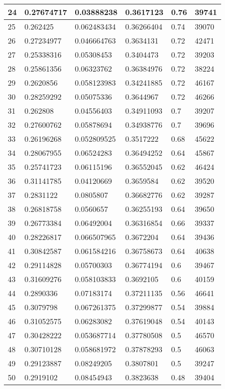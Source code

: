 \begin{longtable}{|l|l|l|l|l|l|}
24 & 0.27674717 & 0.03888238 & 0.3617123 & 0.76 & 39741 \\ \hline 
25 & 0.262425 & 0.062483434 & 0.36266404 & 0.74 & 39070 \\ \hline 
26 & 0.27234977 & 0.046664763 & 0.3634131 & 0.72 & 42471 \\ \hline 
27 & 0.25338316 & 0.05308453 & 0.3404473 & 0.72 & 39203 \\ \hline 
28 & 0.25861356 & 0.06323762 & 0.36384976 & 0.72 & 38224 \\ \hline 
29 & 0.2620856 & 0.058123983 & 0.34241885 & 0.72 & 46167 \\ \hline 
30 & 0.28259292 & 0.05075336 & 0.3644967 & 0.72 & 46266 \\ \hline 
31 & 0.262808 & 0.04556403 & 0.34911093 & 0.7 & 39207 \\ \hline 
32 & 0.27600762 & 0.05878694 & 0.34938776 & 0.7 & 39696 \\ \hline 
33 & 0.26196268 & 0.052809525 & 0.3517222 & 0.68 & 45622 \\ \hline 
34 & 0.28067955 & 0.06524283 & 0.36494252 & 0.64 & 45867 \\ \hline 
35 & 0.25741723 & 0.06115196 & 0.36552045 & 0.62 & 46424 \\ \hline 
36 & 0.31141785 & 0.04120669 & 0.3659584 & 0.62 & 39520 \\ \hline 
37 & 0.2831122 & 0.0805807 & 0.36682776 & 0.62 & 39287 \\ \hline 
38 & 0.26818758 & 0.0560657 & 0.36255193 & 0.64 & 39650 \\ \hline 
39 & 0.26773384 & 0.06492004 & 0.36316854 & 0.66 & 39337 \\ \hline 
40 & 0.28226817 & 0.066507965 & 0.3672204 & 0.64 & 39436 \\ \hline 
41 & 0.30842587 & 0.061584216 & 0.36758673 & 0.64 & 40638 \\ \hline 
42 & 0.29114828 & 0.05700303 & 0.36774194 & 0.6 & 39467 \\ \hline 
43 & 0.31609276 & 0.058103833 & 0.3692105 & 0.6 & 40159 \\ \hline 
44 & 0.2890336 & 0.07183174 & 0.37211135 & 0.56 & 46641 \\ \hline 
45 & 0.3079798 & 0.067261375 & 0.37299877 & 0.54 & 39884 \\ \hline 
46 & 0.31052575 & 0.06283082 & 0.37619048 & 0.54 & 40143 \\ \hline 
47 & 0.30428222 & 0.053687714 & 0.37780508 & 0.5 & 46570 \\ \hline 
48 & 0.30710128 & 0.058681972 & 0.37878293 & 0.5 & 46063 \\ \hline 
49 & 0.29123887 & 0.08249205 & 0.3807801 & 0.5 & 39247 \\ \hline 
50 & 0.2919102 & 0.08454943 & 0.3823638 & 0.48 & 39404 \\ \hline 
\end{longtable}